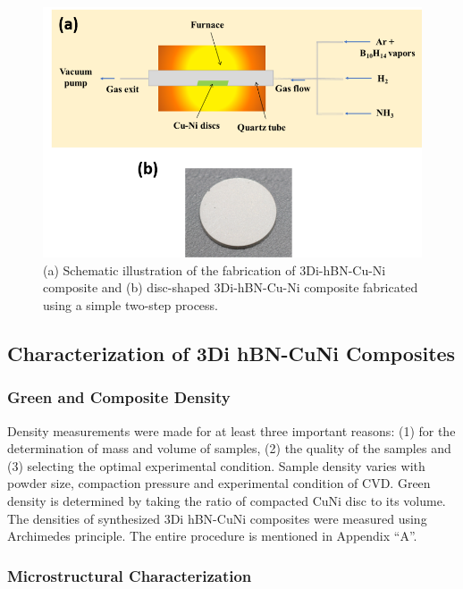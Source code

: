\begin{figure}[!htb]
\centering
\includegraphics[width=\linewidth]{graphics/chapter_2/CVD_furnace}
\caption{(a) Schematic illustration of the fabrication of 3Di-hBN-Cu-Ni composite and (b) disc-shaped 3Di-hBN-Cu-Ni composite fabricated using a simple two-step process.}
\label{fig:CVD_furnace}
\end{figure}

\subsection{Characterization of 3Di hBN-CuNi Composites}

\subsubsection{Green and Composite Density}
Density measurements were made for at least three important reasons: (1) for the determination of mass and volume of samples, (2) the quality of the samples and (3) selecting the optimal experimental condition. Sample density varies with powder size, compaction pressure and experimental condition of CVD. Green density is determined by taking the ratio of compacted CuNi disc to its volume. The densities of synthesized 3Di hBN-CuNi composites were measured using Archimedes principle. The entire procedure is mentioned in Appendix “A”.

\subsubsection{Microstructural Characterization}

